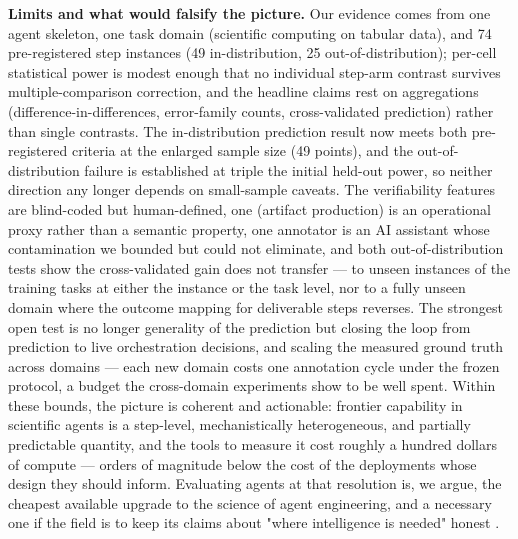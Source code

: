 \textbf{Limits and what would falsify the picture.} Our evidence comes from one agent skeleton, one task domain (scientific computing on tabular data), and 74 pre-registered step instances (49 in-distribution, 25 out-of-distribution); per-cell statistical power is modest enough that no individual step-arm contrast survives multiple-comparison correction, and the headline claims rest on aggregations (difference-in-differences, error-family counts, cross-validated prediction) rather than single contrasts. The in-distribution prediction result now meets both pre-registered criteria at the enlarged sample size (49 points), and the out-of-distribution failure is established at triple the initial held-out power, so neither direction any longer depends on small-sample caveats. The verifiability features are blind-coded but human-defined, one (artifact production) is an operational proxy rather than a semantic property, one annotator is an AI assistant whose contamination we bounded but could not eliminate, and both out-of-distribution tests show the cross-validated gain does not transfer --- to unseen instances of the training tasks at either the instance or the task level, nor to a fully unseen domain where the outcome mapping for deliverable steps reverses. The strongest open test is no longer generality of the prediction but closing the loop from prediction to live orchestration decisions, and scaling the measured ground truth across domains --- each new domain costs one annotation cycle under the frozen protocol, a budget the cross-domain experiments show to be well spent. Within these bounds, the picture is coherent and actionable: frontier capability in scientific agents is a step-level, mechanistically heterogeneous, and partially predictable quantity, and the tools to measure it cost roughly a hundred dollars of compute --- orders of magnitude below the cost of the deployments whose design they should inform. Evaluating agents at that resolution is, we argue, the cheapest available upgrade to the science of agent engineering, and a necessary one if the field is to keep its claims about "where intelligence is needed" honest \cite{beel2025evaluating,miyai2025scientist,emami2026position}.

